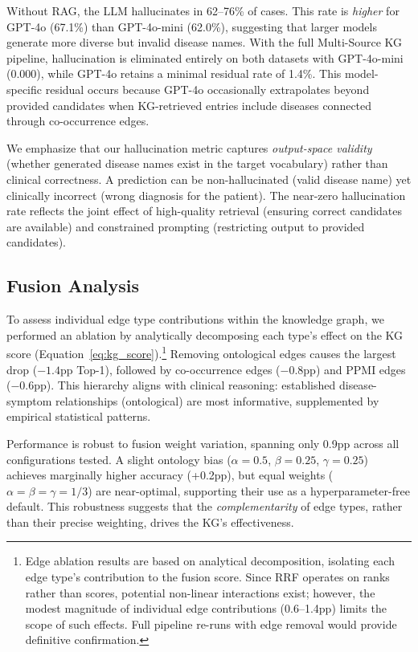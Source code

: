 \documentclass[runningheads]{llncs}
\begin{document}
Without RAG, the LLM hallucinates in 62--76\% of cases. This rate is \emph{higher} for GPT-4o (67.1\%) than GPT-4o-mini (62.0\%), suggesting that larger models generate more diverse but invalid disease names. With the full Multi-Source KG pipeline, hallucination is eliminated entirely on both datasets with GPT-4o-mini (0.000), while GPT-4o retains a minimal residual rate of 1.4\%. This model-specific residual occurs because GPT-4o occasionally extrapolates beyond provided candidates when KG-retrieved entries include diseases connected through co-occurrence edges.

We emphasize that our hallucination metric captures \emph{output-space validity} (whether generated disease names exist in the target vocabulary) rather than clinical correctness. A prediction can be non-hallucinated (valid disease name) yet clinically incorrect (wrong diagnosis for the patient). The near-zero hallucination rate reflects the joint effect of high-quality retrieval (ensuring correct candidates are available) and constrained prompting (restricting output to provided candidates).

\subsection{Fusion Analysis}
\label{sec:fusion_analysis}

To assess individual edge type contributions within the knowledge graph, we performed an ablation by analytically decomposing each type's effect on the KG score (Equation~\ref{eq:kg_score}).\footnote{Edge ablation results are based on analytical decomposition, isolating each edge type's contribution to the fusion score. Since RRF operates on ranks rather than scores, potential non-linear interactions exist; however, the modest magnitude of individual edge contributions (0.6--1.4pp) limits the scope of such effects. Full pipeline re-runs with edge removal would provide definitive confirmation.} Removing ontological edges causes the largest drop ($-1.4$pp Top-1), followed by co-occurrence edges ($-0.8$pp) and PPMI edges ($-0.6$pp). This hierarchy aligns with clinical reasoning: established disease-symptom relationships (ontological) are most informative, supplemented by empirical statistical patterns.

Performance is robust to fusion weight variation, spanning only 0.9pp across all configurations tested. A slight ontology bias ($\alpha{=}0.5$, $\beta{=}0.25$, $\gamma{=}0.25$) achieves marginally higher accuracy (+0.2pp), but equal weights ($\alpha{=}\beta{=}\gamma{=}1/3$) are near-optimal, supporting their use as a hyperparameter-free default. This robustness suggests that the \emph{complementarity} of edge types, rather than their precise weighting, drives the KG's effectiveness.
\end{document}
